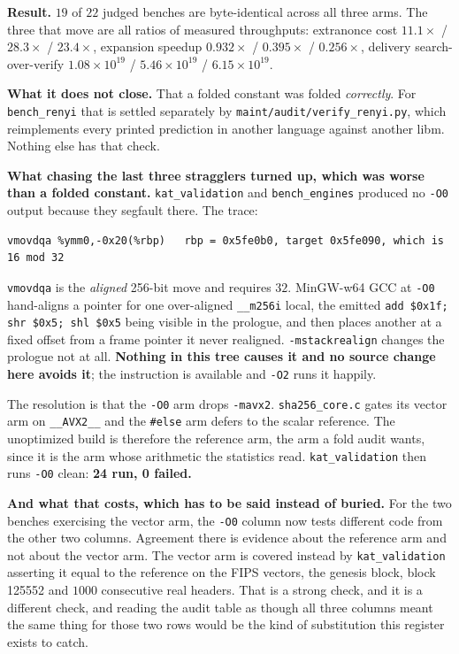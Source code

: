 \textbf{Result.} \(19\) of \(22\) judged benches are byte-identical across all three arms. The three that move are all ratios of measured throughputs: extranonce cost \(11.1\times\) / \(28.3\times\) / \(23.4\times\), expansion speedup \(0.932\times\) / \(0.395\times\) / \(0.256\times\), delivery search-over-verify \(1.08 \times 10^{19}\) / \(5.46 \times 10^{19}\) / \(6.15 \times 10^{19}\).

\textbf{What it does not close.} That a folded constant was folded \emph{correctly}. For \texttt{bench\_renyi} that is settled separately by \texttt{maint/\allowbreak{}audit/\allowbreak{}verify\_renyi.py}, which reimplements every printed prediction in another language against another libm. Nothing else has that check.

\textbf{What chasing the last three stragglers turned up, which was worse than a folded constant.} \texttt{kat\_validation} and \texttt{bench\_engines} produced no \texttt{-O0} output because they segfault there. The trace:

\begin{verbatim}
vmovdqa %ymm0,-0x20(%rbp)   rbp = 0x5fe0b0, target 0x5fe090, which is 16 mod 32
\end{verbatim}

\texttt{vmovdqa} is the \emph{aligned} 256-bit move and requires \(32\). MinGW-w64 GCC at \texttt{-O0} hand-aligns a pointer for one over-aligned \texttt{\_\_m256i} local, the emitted \texttt{add \$0x1f; shr \$0x5; shl \$0x5} being visible in the prologue, and then places another at a fixed offset from a frame pointer it never realigned. \texttt{-mstackrealign} changes the prologue not at all. \textbf{Nothing in this tree causes it and no source change here avoids it}; the instruction is available and \texttt{-O2} runs it happily.

The resolution is that the \texttt{-O0} arm drops \texttt{-mavx2}. \texttt{sha256\_core.c} gates its vector arm on \texttt{\_\_AVX2\_\_} and the \texttt{\#else} arm defers to the scalar reference. The unoptimized build is therefore the reference arm, the arm a fold audit wants, since it is the arm whose arithmetic the statistics read. \texttt{kat\_validation} then runs \texttt{-O0} clean: \textbf{24 run, 0 failed.}

\textbf{And what that costs, which has to be said instead of buried.} For the two benches exercising the vector arm, the \texttt{-O0} column now tests different code from the other two columns. Agreement there is evidence about the reference arm and not about the vector arm. The vector arm is covered instead by \texttt{kat\_validation} asserting it equal to the reference on the FIPS vectors, the genesis block, block 125552 and \(1000\) consecutive real headers. That is a strong check, and it is a different check, and reading the audit table as though all three columns meant the same thing for those two rows would be the kind of substitution this register exists to catch.

